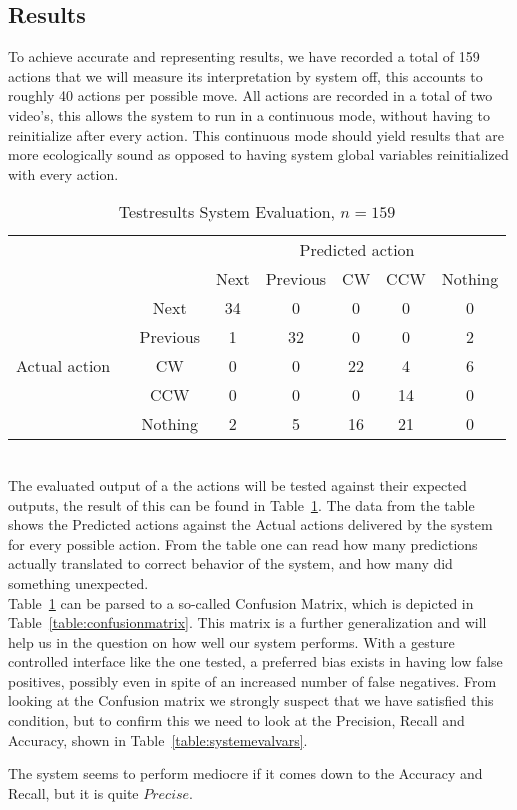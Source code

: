 \documentclass[11pt,a4paper]{article}
\begin{document}
\subsection{Results}
To achieve accurate and representing results, we have recorded a total of 159 actions that we will measure its interpretation by system off, this accounts to roughly 40 actions per possible move.  All actions are recorded in a total of two video's, this allows the system to run in a continuous mode, without having to reinitialize after every action. This continuous mode should yield results that are more ecologically sound as opposed to having system global variables reinitialized with every action.
\begin{table}
\begin{center}
\begin{tabular}{|c|c|c|c|c|c|c|}
\cline{3-7}
\multicolumn{2}{c|}{} & \multicolumn{5}{c|}{Predicted action} \\
\cline{3-7}
\multicolumn{2}{c|}{} & Next & Previous & CW & CCW & Nothing \\
\hline
\multirow{6}{*}{\begin{sideways} Actual action ~ \end{sideways}} & Next & 34 & 0 & 0 & 0 & 0 \\
\cline{2-7}
& Previous & 1 & 32 & 0 & 0 & 2 \\
\cline{2-7}
& CW & 0 & 0  & 22  & 4  & 6  \\
\cline{2-7}
& CCW  & 0  & 0  & 0  & 14 & 0  \\
\cline{2-7}
& Nothing & 2 & 5  & 16  & 21  & 0  \\
\hline
\end{tabular}
\end{center}
\caption{Testresults System Evaluation, $n=159$}
\label{table:systemeval}
\end{table}
\\ The evaluated output of a the actions will be tested against their expected outputs, the result of this can be found in Table~\ref{table:systemeval}. The data from the table shows the Predicted actions against the Actual actions delivered by the system for every possible action. From the table one can read how many predictions actually translated to correct behavior of the system, and how many did something unexpected.
\\ Table~\ref{table:systemeval} can be parsed to a so-called Confusion Matrix, which is depicted in Table~\ref{table:confusionmatrix}. This matrix is a further generalization and will help us in the question on how well our system performs. With a gesture controlled interface like the one tested, a preferred bias exists in having low false positives, possibly even in spite of an increased number of false negatives. From looking at the Confusion matrix we strongly suspect that we have satisfied this condition, but to confirm this we need to look at the Precision, Recall and Accuracy, shown in Table~\ref{table:systemevalvars}.
\par The system seems to perform mediocre if it comes down to the Accuracy and Recall, but it is quite $Precise$. 
\end{document}
